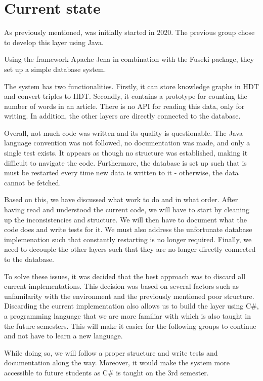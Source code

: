 \section{Current state}

As previously mentioned, \knox{} was initially started in 2020.
The previous group chose to develop this layer using Java.

Using the framework Apache Jena in combination with the Fuseki package, they set up a simple database system.

The system has two functionalities. 
Firstly, it can store knowledge graphs in HDT and convert triples to HDT.
Secondly, it contains a prototype for counting the number of words in an article.
There is no API for reading this data, only for writing. 
In addition, the other layers are directly connected to the database.

Overall, not much code was written and its quality is questionable. 
The Java language convention was not followed, no documentation was made, and only a single test exists. 
It appears as though no structure was established, making it difficult to navigate the code. 
Furthermore, the database is set up such that is must be restarted every time new data is written to it - otherwise, the data cannot be fetched.

Based on this, we have discussed what work to do and in what order.
After having read and understood the current code, we will have to start by cleaning up the inconsistencies and structure.
We will then have to document what the code does and write tests for it.
We must also address the unfortunate database implemenation such that constantly restarting is no longer required.
Finally, we need to decouple the other layers such that they are no longer directly connected to the database.

To solve these issues, it was decided that the best approach was to discard all current implementations. 
This decision was based on several factors such as unfamilarity with the environment and the previously mentioned poor structure. 
Discarding the current implementation also allows us to build the layer using C#, a programming language that we are more familiar with which is also taught in the future semesters. 
This will make it easier for the following groups to continue and not have to learn a new language.

While doing so, we will follow a proper structure and write tests and documentation along the way. 
Moreover, it would make the system more accessible to future students as C# is taught on the 3rd semester.